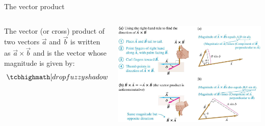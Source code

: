 \documentclass[18pt]{LectMechanics}
\begin{document}
\begin{frame}[t]{The vector product}{}
\begin{columns}
	\begin{column}{0.4\linewidth}
		The vector (or cross) product of two vectors $\vec a$ and $\vec b$ is written as $\vec a \times \vec b$ and is the vector whose magnitude is given by:
		\begin{equation*}
		\tcbhighmath[drop fuzzy shadow]{|\vec a \times \vec b| = ab\sin\phi}
		\end{equation*}
	\end{column}
	\begin{column}{0.6\linewidth}
		\begin{center}
			\includegraphics[width=\linewidth]{Vector_prod}
		\end{center}
	\end{column}
\end{columns}

\end{frame}
\end{document}
